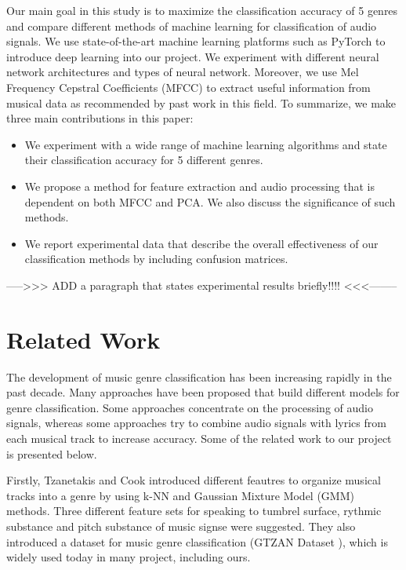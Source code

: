 Our main goal in this study is to maximize the classification accuracy of 5 genres and compare different methods of machine learning for classification of audio signals. We use state-of-the-art machine learning platforms such as PyTorch \cite{PyTorch:2017} to introduce deep learning into our project. We experiment with different neural network architectures and types of neural network. Moreover, we use Mel Frequency Cepstral Coefficients (MFCC) \cite{MFCC:2011} to extract useful information from musical data as recommended by past work in this field.
To summarize, we make three main contributions in this paper:
\begin{itemize}
  \item We experiment with a wide range of machine learning algorithms and state their classification accuracy for 5 different genres. 
  \item We propose a method for feature extraction and audio processing that is dependent on both MFCC and PCA. We also discuss the significance of such methods. 
  \item We report experimental data that describe the overall effectiveness of our classification methods by including confusion matrices. 
\end{itemize}

----->>> ADD a paragraph that states experimental results briefly!!!! <<<-------- 

\section{Related Work}\label{sec:related}

The development of music genre classification has been increasing rapidly in the past decade. Many approaches have been proposed that build different models for genre classification. Some approaches concentrate on the processing of audio signals, whereas some approaches try to combine audio signals with lyrics from each musical track to increase accuracy. Some of the related work to our project is presented below. 

Firstly, Tzanetakis and Cook \cite{GTZAN:2002} introduced different feautres to organize musical tracks into a genre by using k-NN and Gaussian Mixture Model (GMM) methods. Three different feature sets for speaking to tumbrel surface, rythmic substance and pitch substance of music signse were suggested. They also introduced a dataset for music genre classification (GTZAN Dataset \cite{GTZAN:2002}), which is widely used today in many project, including ours. 

